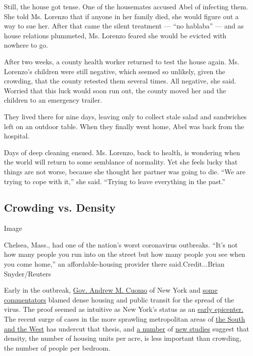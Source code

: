 Still, the house got tense. One of the housemates accused Abel of
infecting them. She told Ms. Lorenzo that if anyone in her family died,
she would figure out a way to sue her. After that came the silent
treatment --- ``no hablaba'' --- and as house relations plummeted, Ms.
Lorenzo feared she would be evicted with nowhere to go.

After two weeks, a county health worker returned to test the house
again. Ms. Lorenzo's children were still negative, which seemed so
unlikely, given the crowding, that the county retested them several
times. All negative, she said. Worried that this luck would soon run
out, the county moved her and the children to an emergency trailer.

They lived there for nine days, leaving only to collect stale salad and
sandwiches left on an outdoor table. When they finally went home, Abel
was back from the hospital.

Days of deep cleaning ensued. Ms. Lorenzo, back to health, is wondering
when the world will return to some semblance of normality. Yet she feels
lucky that things are not worse, because she thought her partner was
going to die. ``We are trying to cope with it,'' she said. ``Trying to
leave everything in the past.''

\hypertarget{crowding-vs-density}{%
\subsection{Crowding vs. Density}\label{crowding-vs-density}}

Image

Chelsea, Mass., had one of the nation's worst coronavirus outbreaks.
``It's not how many people you run into on the street but how many
people you see when you come home,'' an affordable-housing provider
there said.Credit...Brian Snyder/Reuters

Early in the outbreak,
\href{https://www.nytimes3xbfgragh.onion/2020/03/24/upshot/coronavirus-urban-density-risks.html}{Gov.
Andrew M. Cuomo} of New York and
\href{https://www.latimes.com/opinion/story/2020-04-26/coronavirus-cities-density-los-angeles-transit}{some
commentators} blamed dense housing and public transit for the spread of
the virus. The proof seemed as intuitive as New York's status as an
\href{https://www.nytimes3xbfgragh.onion/2020/03/22/nyregion/Coronavirus-new-York-epicenter.html}{early
epicenter.} The recent surge of cases in the more sprawling metropolitan
areas of
\href{https://www.nytimes3xbfgragh.onion/2020/06/14/us/coronavirus-united-states.html}{the
South and the West} has undercut that thesis, and
\href{https://jamanetwork.com/journals/jama/fullarticle/2767631?widget=personalizedcontent\&previousarticle=2768532}{a
number} of
\href{https://www.tandfonline.com/doi/full/10.1080/01944363.2020.1777891?scroll=top\&needAccess=true\&}{new
studies} suggest that density, the number of housing units per acre, is
less important than crowding, the number of people per bedroom.

